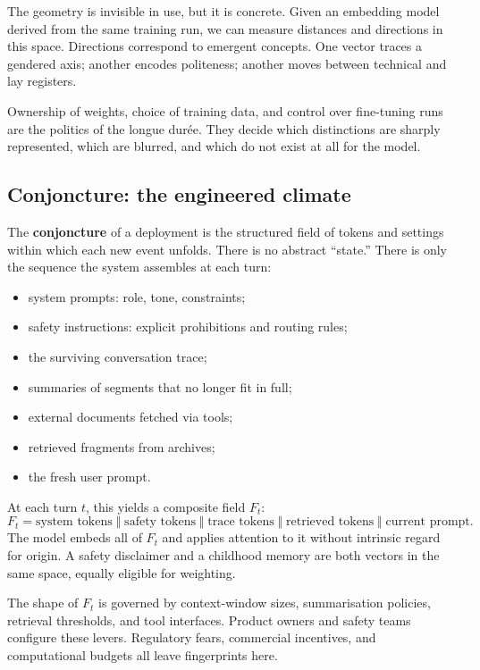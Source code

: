 \documentclass[12pt,a4paper]{article}
\begin{document}
The geometry is invisible in use, but it is concrete. Given an embedding model derived from the same training run, we can measure distances and directions in this space. Directions correspond to emergent concepts. One vector traces a gendered axis; another encodes politeness; another moves between technical and lay registers.

Ownership of weights, choice of training data, and control over fine-tuning runs are the politics of the longue dur\'ee. They decide which distinctions are sharply represented, which are blurred, and which do not exist at all for the model.

\subsection{Conjoncture: the engineered climate}

The \textbf{conjoncture} of a deployment is the structured field of tokens and settings within which each new event unfolds. There is no abstract ``state.'' There is only the sequence the system assembles at each turn:
\begin{itemize}
  \item system prompts: role, tone, constraints;
  \item safety instructions: explicit prohibitions and routing rules;
  \item the surviving conversation trace;
  \item summaries of segments that no longer fit in full;
  \item external documents fetched via tools;
  \item retrieved fragments from archives;
  \item the fresh user prompt.
\end{itemize}

At each turn $t$, this yields a composite field $F_t$:
\[
F_t = \text{system tokens} \;\Vert\; \text{safety tokens} \;\Vert\; \text{trace tokens} \;\Vert\; \text{retrieved tokens} \;\Vert\; \text{current prompt}.
\]
The model embeds all of $F_t$ and applies attention to it without intrinsic regard for origin. A safety disclaimer and a childhood memory are both vectors in the same space, equally eligible for weighting.

The shape of $F_t$ is governed by context-window sizes, summarisation policies, retrieval thresholds, and tool interfaces. Product owners and safety teams configure these levers. Regulatory fears, commercial incentives, and computational budgets all leave fingerprints here.
\end{document}

